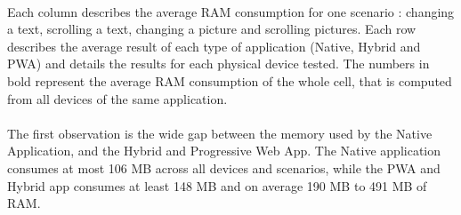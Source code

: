 \documentclass{kththesis}
\begin{document}
\begin{table}[h]
    \centering
    
    \caption{Average RAM consumption (MB)}
    \label{tab:memory}
\end{table}

\paragraph{}
Each column describes the average RAM consumption for one scenario : changing a text, scrolling a text, changing a picture and scrolling pictures. Each row describes the average result of each type of application (Native, Hybrid and PWA) and details the results for each physical device tested. The numbers in bold represent the average RAM consumption of the whole cell, that is computed from all devices of the same application.

\paragraph{}
The first observation is the wide gap between the memory used by the Native Application, and the Hybrid and Progressive Web App. The Native application consumes at most 106 MB across all devices and scenarios, while the PWA and Hybrid app consumes at least 148 MB and on average 190 MB to 491 MB of RAM.
\end{document}
